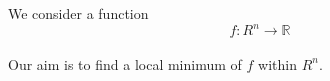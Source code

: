 \documentclass[17pt]{extarticle}
\begin{document}
We consider a function
$$
f: R^n\rightarrow \mathbb{R}
$$
\\
Our aim is to find a local minimum of $f$ within $R^n$.
\end{document}

